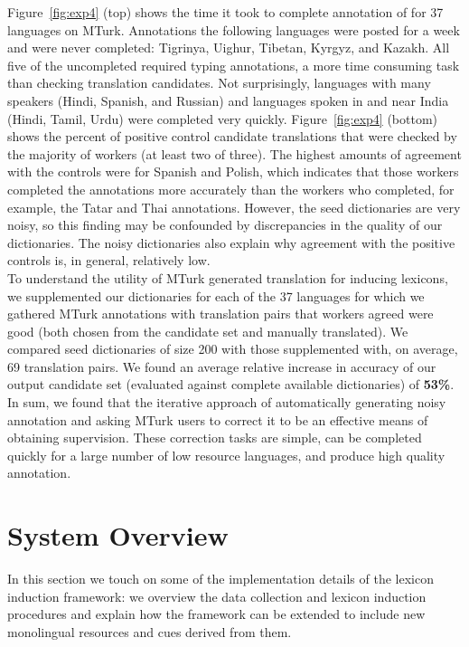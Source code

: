 \documentclass{article}
\newcommand{\figref}[1]{Figure~\ref{#1}}
\begin{document}
\figref{fig:exp4} (top) shows the time it took to complete annotation of for 37 languages on MTurk. Annotations the following languages were posted for a week and were never completed: Tigrinya, Uighur, Tibetan, Kyrgyz, and Kazakh. All five of the uncompleted required typing annotations, a more time consuming task than checking translation candidates. Not surprisingly, languages with many speakers (Hindi, Spanish, and Russian) and languages spoken in and near India (Hindi, Tamil, Urdu) were completed very quickly. \figref{fig:exp4} (bottom) shows the percent of positive control candidate translations that were checked by the majority of workers (at least two of three). The highest amounts of agreement with the controls were for Spanish and Polish, which indicates that those workers completed the annotations more accurately than the workers who completed, for example, the Tatar and Thai annotations. However, the seed dictionaries are very noisy, so this finding may be confounded by discrepancies in the quality of our dictionaries. The noisy dictionaries also explain why agreement with the positive controls is, in general, relatively low.\\

To understand the utility of MTurk generated translation for inducing lexicons, we supplemented our dictionaries for each of the 37 languages for which we gathered MTurk annotations with translation pairs that workers agreed were good (both chosen from the candidate set and manually translated). We compared seed dictionaries of size 200 with those supplemented with, on average, 69 translation pairs. We found an average relative increase in accuracy of our output candidate set (evaluated against complete available dictionaries) of {\bf 53\%}.\\

In sum, we found that the iterative approach of automatically generating noisy annotation and asking MTurk users to correct it to be an effective means of obtaining supervision.  These correction tasks are simple, can be completed quickly for a large number of low resource languages, and produce high quality annotation.

\section{System Overview}

In this section we touch on some of the implementation details of the lexicon induction framework: we overview the data collection and lexicon induction procedures and explain how the framework can be extended to include new monolingual resources and cues derived from them.  
\end{document}
